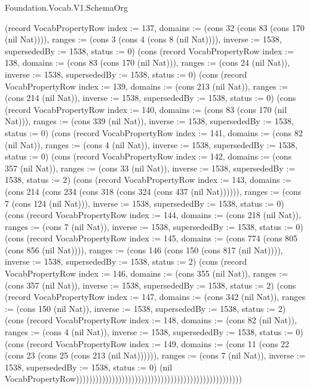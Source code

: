 \begin{lexlean}{Foundation.Vocab.V1.SchemaOrg}
\begin{semanticmodule}
{(record VocabPropertyRow {index := 137, domains := (cons 32 (cons 83 (cons 170 (nil Nat)))), ranges := (cons 3 (cons 4 (cons 8 (nil Nat)))), inverse := 1538, supersededBy := 1538, status := 0}) (cons (record VocabPropertyRow {index := 138, domains := (cons 83 (cons 170 (nil Nat))), ranges := (cons 24 (nil Nat)), inverse := 1538, supersededBy := 1538, status := 0}) (cons (record VocabPropertyRow {index := 139, domains := (cons 213 (nil Nat)), ranges := (cons 214 (nil Nat)), inverse := 1538, supersededBy := 1538, status := 0}) (cons (record VocabPropertyRow {index := 140, domains := (cons 83 (cons 170 (nil Nat))), ranges := (cons 339 (nil Nat)), inverse := 1538, supersededBy := 1538, status := 0}) (cons (record VocabPropertyRow {index := 141, domains := (cons 82 (nil Nat)), ranges := (cons 4 (nil Nat)), inverse := 1538, supersededBy := 1538, status := 0}) (cons (record VocabPropertyRow {index := 142, domains := (cons 357 (nil Nat)), ranges := (cons 33 (nil Nat)), inverse := 1538, supersededBy := 1538, status := 2}) (cons (record VocabPropertyRow {index := 143, domains := (cons 214 (cons 234 (cons 318 (cons 324 (cons 437 (nil Nat)))))), ranges := (cons 7 (cons 124 (nil Nat))), inverse := 1538, supersededBy := 1538, status := 0}) (cons (record VocabPropertyRow {index := 144, domains := (cons 218 (nil Nat)), ranges := (cons 7 (nil Nat)), inverse := 1538, supersededBy := 1538, status := 0}) (cons (record VocabPropertyRow {index := 145, domains := (cons 774 (cons 805 (cons 856 (nil Nat)))), ranges := (cons 146 (cons 150 (cons 817 (nil Nat)))), inverse := 1538, supersededBy := 1538, status := 2}) (cons (record VocabPropertyRow {index := 146, domains := (cons 355 (nil Nat)), ranges := (cons 357 (nil Nat)), inverse := 1538, supersededBy := 1538, status := 2}) (cons (record VocabPropertyRow {index := 147, domains := (cons 342 (nil Nat)), ranges := (cons 150 (nil Nat)), inverse := 1538, supersededBy := 1538, status := 2}) (cons (record VocabPropertyRow {index := 148, domains := (cons 82 (nil Nat)), ranges := (cons 4 (nil Nat)), inverse := 1538, supersededBy := 1538, status := 0}) (cons (record VocabPropertyRow {index := 149, domains := (cons 11 (cons 22 (cons 23 (cons 25 (cons 213 (nil Nat)))))), ranges := (cons 7 (nil Nat)), inverse := 1538, supersededBy := 1538, status := 0}) (nil VocabPropertyRow)))))))))))))))))))))))))))))))))))))))))))))))))))
}


\end{semanticmodule}
\end{lexlean}
